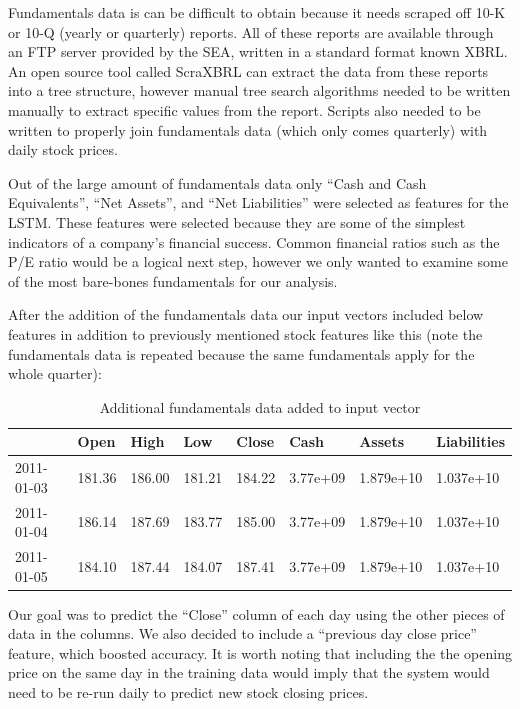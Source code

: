 \documentclass{article}
\begin{document}
Fundamentals data is can be difficult to obtain because it needs scraped off 10-K or 10-Q (yearly or quarterly) reports. All of these reports are available through an FTP server provided by the SEA, written in a standard format known XBRL. An open source tool called ScraXBRL can extract the data from these reports into a tree structure, however manual tree search algorithms needed to be written manually to extract specific values from the report. Scripts also needed to be written to properly join fundamentals data (which only comes quarterly) with daily stock prices. 

Out of the large amount of fundamentals data only “Cash and Cash Equivalents”, “Net Assets”, and “Net Liabilities” were selected as features for the LSTM. These features were selected because they are some of the simplest indicators of a company's financial success. Common financial ratios such as the P/E ratio would be a logical next step, however we only wanted to examine some of the most bare-bones fundamentals for our analysis. 

After the addition of the fundamentals data our input vectors included below features in addition to previously mentioned stock features like this (note the fundamentals data is repeated because the same fundamentals apply for the whole quarter):
\begin{table}[H]
\centering
\begin{adjustbox}{width=0.5\textwidth}
\small
\begin{tabular}{|l|l|l|l|l|l|l|l|}
\hline
 & Open & High & Low & Close  & Cash & Assets & Liabilities \\ \hline
2011-01-03 & 181.36 & 186.00 & 181.21 & 184.22 & 3.77e+09 & 1.879e+10 & 1.037e+10 \\ \hline
2011-01-04 & 186.14 & 187.69 & 183.77 & 185.00 & 3.77e+09 & 1.879e+10 & 1.037e+10 \\ \hline
2011-01-05 & 184.10 & 187.44 & 184.07 & 187.41 & 3.77e+09 & 1.879e+10 & 1.037e+10 \\ \hline
\end{tabular}
\end{adjustbox}
\caption{Additional fundamentals data added to input vector}
\end{table}

Our goal was to predict the “Close” column of each day using the other pieces of data in the columns.  We also decided to include a “previous day close price” feature, which boosted accuracy. It is worth noting that including the the opening price on the same day in the training data would imply that the system would need to be re-run daily to predict new stock closing prices.
\end{document}
